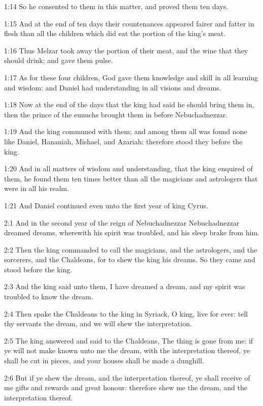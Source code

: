 1:14 So he consented to them in this matter, and proved them ten days.

1:15 And at the end of ten days their countenances appeared fairer and fatter in flesh than all the children which did eat the portion of the king's meat.

1:16 Thus Melzar took away the portion of their meat, and the wine that they should drink; and gave them pulse.

1:17 As for these four children, God gave them knowledge and skill in all learning and wisdom: and Daniel had understanding in all visions and dreams.

1:18 Now at the end of the days that the king had said he should bring them in, then the prince of the eunuchs brought them in before Nebuchadnezzar.

1:19 And the king communed with them; and among them all was found none like Daniel, Hananiah, Mishael, and Azariah: therefore stood they before the king.

1:20 And in all matters of wisdom and understanding, that the king enquired of them, he found them ten times better than all the magicians and astrologers that were in all his realm.

1:21 And Daniel continued even unto the first year of king Cyrus.

2:1 And in the second year of the reign of Nebuchadnezzar Nebuchadnezzar dreamed dreams, wherewith his spirit was troubled, and his sleep brake from him.

2:2 Then the king commanded to call the magicians, and the astrologers, and the sorcerers, and the Chaldeans, for to shew the king his dreams. So they came and stood before the king.

2:3 And the king said unto them, I have dreamed a dream, and my spirit was troubled to know the dream.

2:4 Then spake the Chaldeans to the king in Syriack, O king, live for ever: tell thy servants the dream, and we will shew the interpretation.

2:5 The king answered and said to the Chaldeans, The thing is gone from me: if ye will not make known unto me the dream, with the interpretation thereof, ye shall be cut in pieces, and your houses shall be made a dunghill.

2:6 But if ye shew the dream, and the interpretation thereof, ye shall receive of me gifts and rewards and great honour: therefore shew me the dream, and the interpretation thereof.


